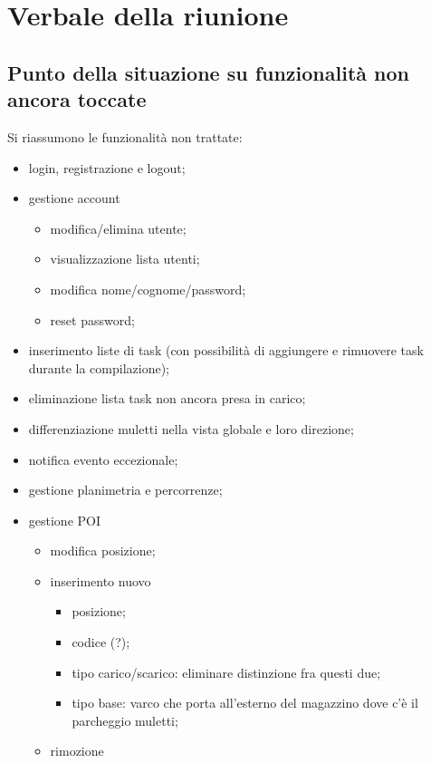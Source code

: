 \section{Verbale della riunione}

\subsection{Punto della situazione su funzionalità non ancora toccate}
    Si riassumono le funzionalità non trattate:
    \begin{itemize}
        \item login, registrazione e logout;
        \item gestione account
            \begin{itemize}
                \item modifica/elimina utente;
                \item visualizzazione lista utenti;
                \item modifica nome/cognome/password;
                \item reset password;
            \end{itemize}
        \item inserimento liste di task (con possibilità di aggiungere e rimuovere task durante la compilazione);
        \item eliminazione lista task non ancora presa in carico;
        \item differenziazione muletti nella vista globale e loro direzione;
        \item notifica evento eccezionale;
        \item gestione planimetria e percorrenze;
        \item gestione POI
        \begin{itemize}
            \item modifica posizione;
            \item inserimento nuovo
            \begin{itemize}
                \item posizione;
                \item codice (?);
                \item tipo carico/scarico: eliminare distinzione fra questi due;
                \item tipo base: varco che porta all’esterno del magazzino dove c'è il parcheggio muletti;
            \end{itemize}
            \item rimozione

\end{itemize}
\end{itemize}
